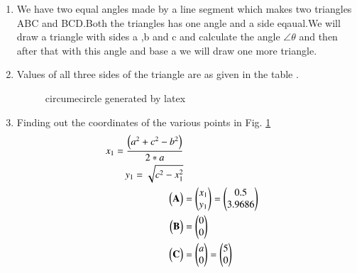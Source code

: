 \begin{enumerate}[label=\thesection.\arabic*.,ref=\thesection.\theenumi]
\item We have  two  equal angles made by a line segment which makes two triangles ABC and BCD.Both the triangles has one angle and a side eqaual.We will draw a triangle with sides a ,b and c and calculate the angle $\angle{\theta}$ and then after that with this angle and base a we will draw one more triangle.

\item Values of all three sides of the triangle are as given in the table .


\begin{figure}[!ht]
\centering
\resizebox{\columnwidth}{!}{}
\caption{ circumecircle generated by latex}
\label{fig:C_circle}	
\end{figure}
%
%
%


%
\begin{table}[ht!]
\centering

\caption{To construct circumecircle}
\label{table:table1}	
\end{table}

\item Finding out  the coordinates of the various points in Fig. \ref{fig:C_circle}
\\
% 
\begin{align}
x_1 = \frac{\left(a^2 + c^2 - b^2\right)}{2*a}
\\
y_1 = \sqrt{c^2 - x_1^2}
\\
\begin{pmatrix}\mathbf{A}\end{pmatrix} &= \begin{pmatrix}x_1 \\ y_1\end{pmatrix} = \begin{pmatrix}0.5\\ 3.9686\end{pmatrix}
\\
\begin{pmatrix}\mathbf{B}\end{pmatrix} &= \begin{pmatrix}0 \\ 0\end{pmatrix}
\\
\begin{pmatrix}\mathbf{C}\end{pmatrix} &= \begin{pmatrix}a\\ 0\end{pmatrix} = \begin{pmatrix}5 \\ 0\end{pmatrix}
\end{align}


\end{enumerate}
